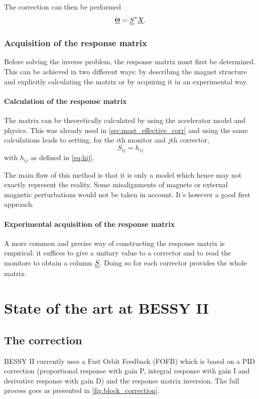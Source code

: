The correction can then be performed
\begin{equation}
\underline{\Theta} = \underline{\underline{S}}^* \underline{X}.
\end{equation}

\subsubsection{Acquisition of the response matrix}
Before solving the inverse problem, the response matrix must first be determined. This can be achieved in two different ways: by describing the magnet structure and explicitly calculating the matrix or by acquiring it in an experimental way.

\paragraph{Calculation of the response matrix}
The matrix can be theoretically calculated by using the accelerator model and physics. This was already used in \cref{sec:most_effective_corr} and using the same calculations leads to setting, for the $i$th monitor and $j$th corrector,
\begin{equation}
S_{ij} = h_{ij}
\end{equation}
with $h_{ij}$ as defined in \cref{eq:hij}.

The main flaw of this method is that it is only a model which hence may not exactly represent the reality. Some misalignments of magnets or external magnetic perturbations would not be taken in account. It's however a good first approach.

\paragraph{Experimental acquisition of the response matrix}
A more common and precise way of constructing the response matrix is empirical: it suffices to give a unitary value to a corrector and to read the monitors to obtain a column $\underline{\underline{S}}$. Doing so for each corrector provides the whole matrix.


\section{State of the art at BESSY II}
\label{sec:correction_state_of_art}
\subsection{The correction}
BESSY II currently uses a Fast Orbit Feedback (FOFB) which is based on a PID correction (proportional response with gain P, integral response with gain I and derivative response with gain D) and the response matrix inversion. The full process goes as presented in \cref{fig:block_correction}.


